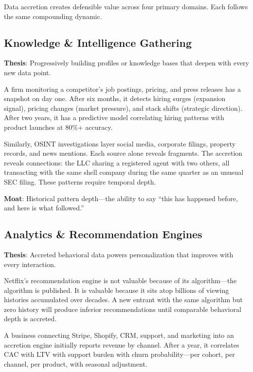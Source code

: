 \documentclass[11pt,twocolumn]{article}
\begin{document}
Data accretion creates defensible value across four primary domains. Each follows the same compounding dynamic.

\subsection{Knowledge \& Intelligence Gathering}

\textbf{Thesis}: Progressively building profiles or knowledge bases that deepen with every new data point.

A firm monitoring a competitor's job postings, pricing, and press releases has a snapshot on day one. After six months, it detects hiring surges (expansion signal), pricing changes (market pressure), and stack shifts (strategic direction). After two years, it has a predictive model correlating hiring patterns with product launches at 80\%+ accuracy.

Similarly, OSINT investigations layer social media, corporate filings, property records, and news mentions. Each source alone reveals fragments. The accretion reveals connections: the LLC sharing a registered agent with two others, all transacting with the same shell company during the same quarter as an unusual SEC filing. These patterns require temporal depth.

\textbf{Moat}: Historical pattern depth---the ability to say ``this has happened before, and here is what followed.''

\subsection{Analytics \& Recommendation Engines}

\textbf{Thesis}: Accreted behavioral data powers personalization that improves with every interaction.

Netflix's recommendation engine is not valuable because of its algorithm---the algorithm is published. It is valuable because it sits atop billions of viewing histories accumulated over decades. A new entrant with the same algorithm but zero history will produce inferior recommendations until comparable behavioral depth is accreted.

A business connecting Stripe, Shopify, CRM, support, and marketing into an accretion engine initially reports revenue by channel. After a year, it correlates CAC with LTV with support burden with churn probability---per cohort, per channel, per product, with seasonal adjustment.
\end{document}
